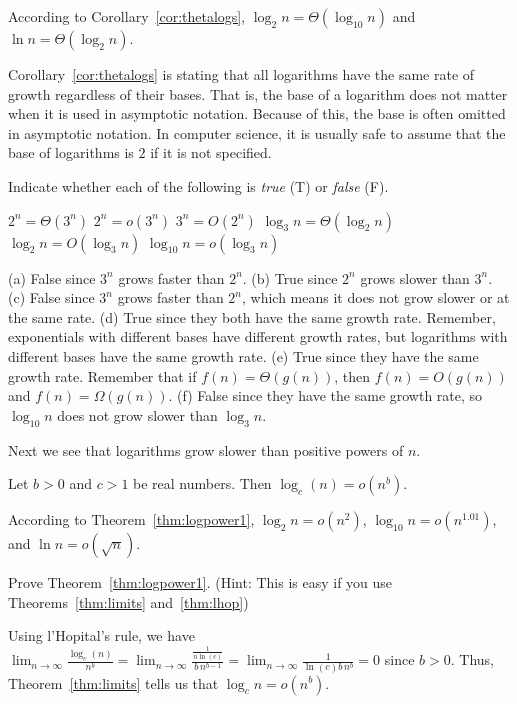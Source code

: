 \begin{exa}
According to Corollary~\ref{cor:thetalogs}, $\log_2 n =\Theta(\log_{10}n)$ 
and $\ln n =\Theta(\log_2 n)$.
\end{exa}

Corollary~\ref{cor:thetalogs} is stating that all logarithms have the same 
rate of growth regardless of their bases.
That is, the base of a logarithm does not matter when it is used
in asymptotic notation.
Because of this, the base is often omitted  in asymptotic notation.  
In computer science, it is usually safe to assume that 
the base of logarithms is $2$ if it is not specified.

\begin{exer}
Indicate whether each of the following is {\em true} (T) or {\em false} (F).

\vspace*{-2ex}
\begin{lenum}
\itemtf
$2^n=\Theta(3^n)$
\itemtf
$2^n=o(3^n)$
\itemtf
$3^n=O(2^n)$
\itemtf
$\log_3 n=\Theta(\log_2 n)$
\itemtf
$\log_2 n=O(\log_3 n)$
\itemtf
$\log_{10} n=o(\log_3 n)$
\end{lenum}
\begin{answer}
(a) False since $3^n$ grows faster than $2^n$.
(b) True since $2^n$ grows slower than $3^n$.
(c) False since $3^n$ grows faster than $2^n$, which means it does not grow
slower or at the same rate.
(d) True since they both have the same growth rate.  Remember, exponentials with
different bases have different growth rates, but logarithms with different bases
have the same growth rate.
(e) True since they have the same growth rate.  Remember that if $f(n)=\Theta(g(n))$, 
then $f(n)=O(g(n))$ and $f(n)=\Omega(g(n))$.
(f) False since they have the same growth rate, so $\log_{10} n$ does not grow slower
than $\log_3 n$.
\end{answer}
\end{exer}
Next we see that logarithms grow slower than positive powers of $n$.  


\begin{thm}\label{thm:logpower1}
Let $b>0$ and $c>1$ be real numbers. Then $\log_c(n)=o(n^b)$.
\end{thm}

\begin{exa}
According to Theorem~\ref{thm:logpower1}, $\log_2 n= o(n^2)$,  $\log_{10} n= o(n^{1.01})$, 
and $\ln n =o(\sqrt{n})$.
\end{exa}

\begin{exer}
Prove Theorem~\ref{thm:logpower1}.
(Hint: This is easy if you use Theorems~\ref{thm:limits} and~\ref{thm:lhop})

\vspace*{2.5in}
\begin{answer}
Using l'Hopital's rule, we have 
$\displaystyle \lim_{n\rightarrow\infty} \frac{\log_c(n)}{n^b} 
=  \lim_{n\rightarrow\infty}\frac{\frac{1}{n\ln(c)}}{b\, n^{b-1}}
=  \lim_{n\rightarrow\infty}\frac{1}{\ln(c)b\, n^b}
=0$ since $b>0$.  Thus, Theorem~\ref{thm:limits} tells us that $\log_c n=o(n^b)$.
\end{answer}
\end{exer}

